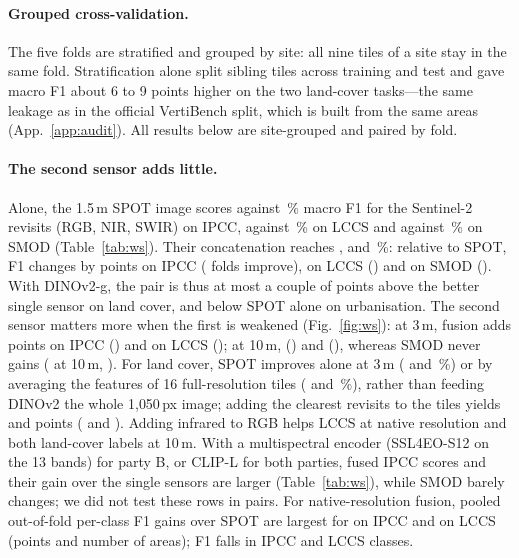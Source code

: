 \paragraph{Grouped cross-validation.}
The five folds are stratified and grouped by site: all nine tiles of a site stay in the same fold. Stratification alone split sibling tiles across training and test and gave macro F1 about 6 to 9 points higher on the two land-cover tasks---the same leakage as in the official VertiBench split, which is built from the same areas (App.~\ref{app:audit}). All results below are site-grouped and paired by fold.

\paragraph{The second sensor adds little.}
Alone, the 1.5\,m SPOT image scores \wsIpccSpot{} against \wsIpccSms\,\% macro F1 for the Sentinel-2 revisits (RGB, NIR, SWIR) on IPCC, \wsLccsSpot{} against \wsLccsSms\,\% on LCCS and \wsSmodSpot{} against \wsSmodSms\,\% on SMOD (Table~\ref{tab:ws}). Their concatenation reaches \wsIpccFus, \wsLccsFus{} and \wsSmodFus\,\%: relative to SPOT, F1 changes by \wgIpccA{} points on IPCC (\wgIpccAW{} folds improve), \wgLccsA{} on LCCS (\wgLccsAW) and \wgSmodA{} on SMOD (\wgSmodAW). With DINOv2-g, the pair is thus at most a couple of points above the better single sensor on land cover, and below SPOT alone on urbanisation. The second sensor matters more when the first is weakened (Fig.~\ref{fig:ws}): at 3\,m, fusion adds \wgIpccThree{} points on IPCC (\wgIpccThreeW) and \wgLccsThree{} on LCCS (\wgLccsThreeW); at 10\,m, \wgIpccTen{} (\wgIpccTenW) and \wgLccsTen{} (\wgLccsTenW), whereas SMOD never gains (\wgSmodTen{} at 10\,m, \wgSmodTenW). For land cover, SPOT improves alone at 3\,m (\wsIpccSpotThree{} and \wsLccsSpotThree\,\%) or by averaging the features of 16 full-resolution tiles (\wfIpccSpotTiles{} and \wfLccsSpotTiles\,\%), rather than feeding DINOv2 the whole 1{,}050\,px image; adding the clearest revisits to the tiles yields \wpIpccTilesFus{} and \wpLccsTilesFus{} points (\wpIpccTilesFusW{} and \wpLccsTilesFusW). Adding infrared to RGB helps LCCS at native resolution and both land-cover labels at 10\,m. With a multispectral encoder (SSL4EO-S12 on the 13 bands) for party B, or CLIP-L for both parties, fused IPCC scores and their gain over the single sensors are larger (Table~\ref{tab:ws}), while SMOD barely changes; we did not test these rows in pairs. For native-resolution fusion, pooled out-of-fold per-class F1 gains over SPOT are largest for \wcIpccTop{} on IPCC and \wcLccsTop{} on LCCS (points and number of areas); F1 falls in \wcIpccNeg{} IPCC and \wcLccsNeg{} LCCS classes.

